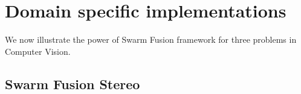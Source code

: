 \section{Domain specific implementations}
We now illustrate the power of Swarm Fusion framework for three problems
in Computer Vision. 

\subsection{Swarm Fusion Stereo}

